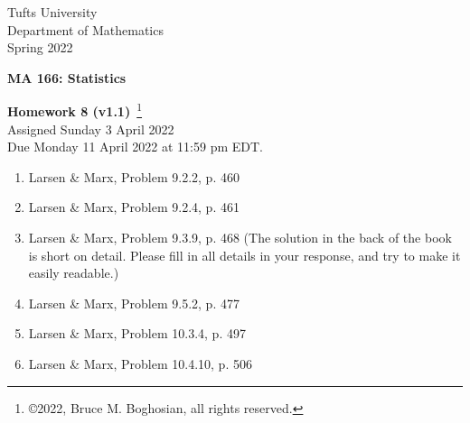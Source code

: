 \documentclass [12pt] {article}
\begin{document}
\thispagestyle{empty}
\begin{center}
Tufts University\\
Department of Mathematics\\
Spring 2022 \\
\end{center}
\begin{center}
{\bf MA 166: Statistics}\\
\end{center}
\begin{center}
{\bf\Large Homework 8 {\small (v1.1)}}~\footnote{\copyright 2022, Bruce M. Boghosian, all rights reserved.}\\
Assigned Sunday 3 April 2022\\
Due Monday 11 April 2022 at 11:59 pm EDT.
\end{center}

\begin{enumerate}

\item Larsen \& Marx, Problem 9.2.2, p. 460

\item Larsen \& Marx, Problem 9.2.4, p. 461

\item Larsen \& Marx, Problem 9.3.9, p. 468  (The solution in the back of the book is short on detail.  Please fill in all details in your response, and try to make it easily readable.)

\item Larsen \& Marx, Problem 9.5.2, p. 477

\item Larsen \& Marx, Problem 10.3.4, p. 497

\item Larsen \& Marx, Problem 10.4.10, p. 506

\end{enumerate}
\end{document}
